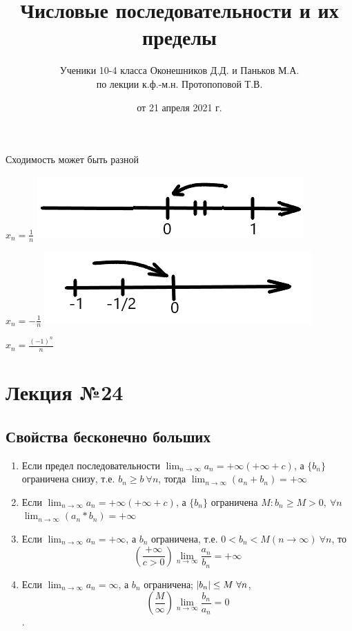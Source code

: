 \documentclass{article}
\begin{document}
\begin{enumerate}
    Сходимость может быть разной

    \(x_n = \frac{1}{n}\)
    \qquad \includegraphics[scale=0.3]{22_0}

    \(x_n = -\frac{1}{n}\)
    \qquad \includegraphics[scale=0.3]{22_1}

    \(x_n = \frac{(-1)^n}{n}\)
    
\end{enumerate}
    \title{Числовые последовательности и их пределы}
    \author{Ученики 10-4 класса Оконешников Д.Д. и Паньков М.А.\\ по лекции к.ф.-м.н. Протопоповой Т.В.}
    \date{от 21 апреля 2021 г.}
    \maketitle

    \section{Лекция №24}
    \subsection{Свойства бесконечно больших}

    \begin{enumerate}
        \item Если предел последовательности \( \lim_{n \rightarrow \infty }a_n = + \infty \)\( (+\infty + c) \), а \( \{b_n\} \) ограничена снизу, т.е. \( b_n \geq b\ \forall n \), тогда \(\lim_{n \rightarrow \infty}{(a_n + b_n)} = +\infty\)
       
        \item Если \( \lim_{n \rightarrow \infty }a_n = + \infty \)\( (+\infty + c) \), а \( \{b_n\} \) ограничена \( M: b_n \geq M > 0,\ \forall n \)
    \(\lim_{n \rightarrow \infty}{(a_n * b_n)} = +\infty\)

        \item Если \( \lim_{n \rightarrow \infty }a_n = +\infty \), а \( b_n \) ограничена, т.е. \( 0 < b_n < M (n \rightarrow \infty)\ \forall n \), то \[ (\frac{+\infty}{c > 0}) \lim_{n \rightarrow \infty}{\frac{a_n}{b_n}} = +\infty\]
    
        \item Если \(\lim_{n \rightarrow \infty}{a_n} = \infty\), а \(b_n\) ограничена; \(\abs{b_n} \leq M\  \forall n\), \[ (\frac{M}{\infty}) \lim_{n \rightarrow \infty }\frac{b_n}{a_n} = 0 \].
    \end{enumerate}
\end{document}
